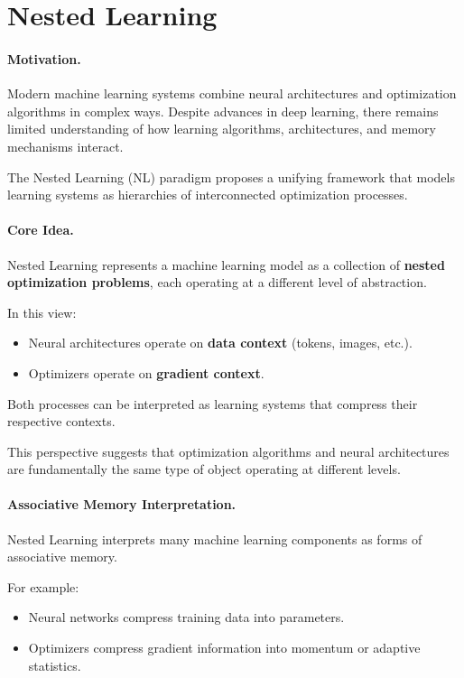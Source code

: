 \documentclass[12pt]{article}
\begin{document}
\psetheader %

\section*{Nested Learning}

\paragraph{Motivation.}
Modern machine learning systems combine neural architectures and optimization algorithms
in complex ways. Despite advances in deep learning, there remains limited understanding
of how learning algorithms, architectures, and memory mechanisms interact.

The Nested Learning (NL) paradigm proposes a unifying framework that models learning
systems as hierarchies of interconnected optimization processes.

\paragraph{Core Idea.}
Nested Learning represents a machine learning model as a collection of
\textbf{nested optimization problems}, each operating at a different level
of abstraction. \cite{nestedlearning}

In this view:

\begin{itemize}
		\item Neural architectures operate on \textbf{data context} (tokens, images, etc.).
		\item Optimizers operate on \textbf{gradient context}.
\end{itemize}

Both processes can be interpreted as learning systems that compress their respective contexts.

This perspective suggests that optimization algorithms and neural architectures
are fundamentally the same type of object operating at different levels.

\paragraph{Associative Memory Interpretation.}
Nested Learning interprets many machine learning components as forms of associative memory.

For example:

\begin{itemize}
		\item Neural networks compress training data into parameters.
		\item Optimizers compress gradient information into momentum or adaptive statistics.
\end{itemize}
\end{document}
